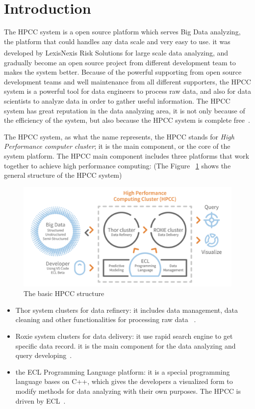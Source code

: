 \section{Introduction}

The HPCC system is a open source platform which serves Big Data analyzing, the platform that could handles any data scale and very easy to use. it was developed by LexisNexis\textsuperscript{\textregistered} Risk Solutions for large scale data analyzing, and gradually become an open source project from different development team to makes the system better. Because of the powerful supporting from open source development teams and well maintenance from all different supporters, the HPCC system is a powerful tool for data engineers to process raw data, and also for data scientists to analyze data in order to gather useful information. The HPCC system has great reputation in the data analyzing area, it is not only because of the efficiency of the system, but also because the HPCC system is complete free~\cite{Intro1}.

The HPCC system, as what the name represents, the HPCC stands for \textit{High Performance computer cluster}; it is the main component, or the core of the system platform. The HPCC main component includes three platforms that work together to achieve high performance computing: (The Figure ~\ref{f:hpcc} shows the general structure of the HPCC system)

\begin{figure}[!ht]
\centering\includegraphics[width=\columnwidth]{images/hpcc.png}
\caption{The basic HPCC structure}\label{f:hpcc}
\end{figure}

\begin{itemize}
	\item Thor system clusters for data refinery: it includes data management, data cleaning and other functionalities for processing raw data ~\cite{Intro3}.
	\item Roxie system clusters for data delivery: it use rapid search engine to get specific data record. it is the main component for the data analyzing and query developing~\cite{HPCC}.
	\item the ECL Programming Language platform: it is a special programming language bases on C++, which gives the developers a visualized form to modify methods for data analyzing with their own purposes. The HPCC is driven by ECL~\cite{Intro2}.
\end{itemize}

